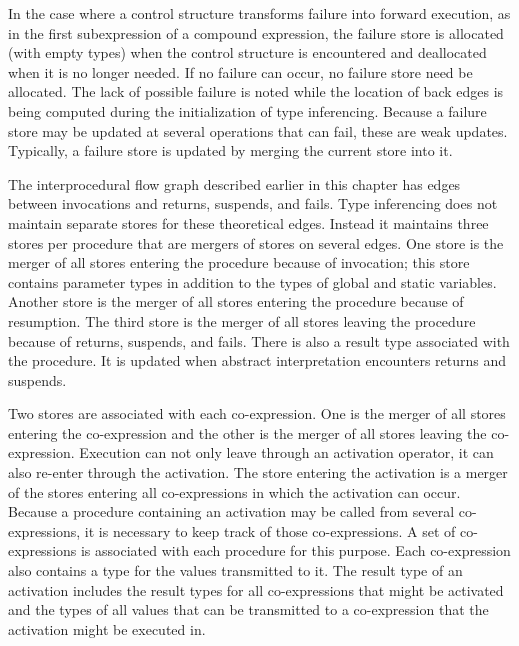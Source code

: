 In the case where a control structure transforms failure into forward
execution, as in the first subexpression of a compound expression, the
failure store is allocated (with empty types) when the control
structure is encountered and deallocated when it is no longer
needed. If no failure can occur, no failure store need be
allocated. The lack of possible failure is noted while the location of
back edges is being computed during the initialization of type
inferencing. Because a failure store may be updated at several
operations that can fail, these are weak updates.  Typically, a
failure store is updated by merging the current store into it.

The interprocedural flow graph described earlier in this chapter has
edges between invocations and returns, suspends, and fails. Type
inferencing does not maintain separate stores for these theoretical
edges. Instead it maintains three stores per procedure that are
mergers of stores on several edges. One store is the merger of all
stores entering the procedure because of invocation; this store
contains parameter types in addition to the types of global and static
variables. Another store is the merger of all stores entering the
procedure because of resumption. The third store is the merger of all
stores leaving the procedure because of returns, suspends, and
fails. There is also a result type associated with the procedure. It
is updated when abstract interpretation encounters returns and
suspends.

Two stores are associated with each co-expression. One is the merger
of all stores entering the co-expression and the other is the merger
of all stores leaving the co-expression. Execution can not only leave
through an activation operator, it can also re-enter through the
activation. The store entering the activation is a merger of the
stores entering all co-expressions in which the activation can
occur. Because a procedure containing an activation may be called from
several co-expressions, it is necessary to keep track of those
co-expressions. A set of co-expressions is associated with each
procedure for this purpose. Each co-expression also contains a type
for the values transmitted to it. The result type of an activation
includes the result types for all co-expressions that might be
activated and the types of all values that can be transmitted to a
co-expression that the activation might be executed in.

